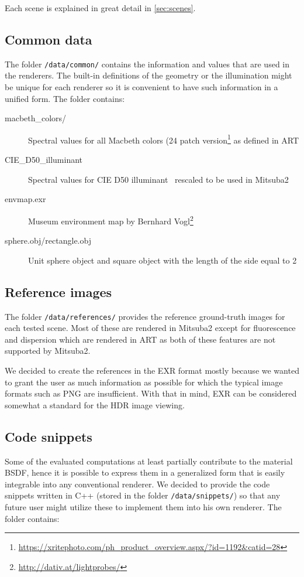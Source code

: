 Each scene is explained in great detail in \autoref{sec:scenes}.

\subsection{Common data}

The folder \texttt{/data/common/} contains the information and values that are used in the renderers. The built-in definitions of the geometry or the illumination might be unique for each renderer so it is convenient to have such information in a unified form. The folder contains:

\begin{description}
	\item[macbeth\_colors/] Spectral values for all Macbeth colors (24 patch version\footnote{\url{https://xritephoto.com/ph_product_overview.aspx/?id=1192&catid=28}} as defined in ART
	\item[CIE\_D50\_illuminant] Spectral values for CIE D50 illuminant~\cite{cieData} rescaled to be used in Mitsuba2
	\item[envmap.exr] Museum environment map by Bernhard Vogl\footnote{\url{http://dativ.at/lightprobes/}}
	\item[sphere.obj/rectangle.obj] Unit sphere object and square object with the length of the side equal to 2
\end{description}

\subsection{Reference images}

The folder \texttt{/data/references/} provides the reference ground-truth images for each tested scene. Most of these are rendered in Mitsuba2 except for fluorescence and dispersion which are rendered in ART as both of these features are not supported by Mitsuba2.

We decided to create the references in the EXR format mostly because we wanted to grant the user as much information as possible for which the typical image formats such as PNG are insufficient. With that in mind, EXR can be considered somewhat a standard for the HDR image viewing.

\subsection{Code snippets}

Some of the evaluated computations at least partially contribute to the material BSDF, hence it is possible to express them in a generalized form that is easily integrable into any conventional renderer. We decided to provide the code snippets written in C++ (stored in the folder \texttt{/data/snippets/}) so that any future user might utilize these to implement them into his own renderer. The folder contains:

